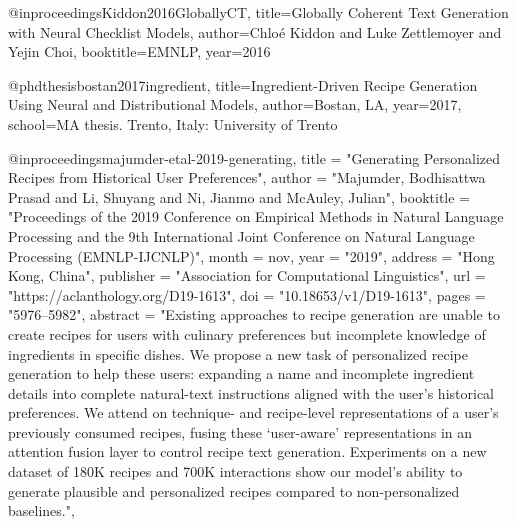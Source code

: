 @inproceedings{Kiddon2016GloballyCT,
  title={Globally Coherent Text Generation with Neural Checklist Models},
  author={Chlo{\'e} Kiddon and Luke Zettlemoyer and Yejin Choi},
  booktitle={EMNLP},
  year={2016}
}

@phdthesis{bostan2017ingredient,
  title={Ingredient-Driven Recipe Generation Using Neural and Distributional Models},
  author={Bostan, LA},
  year={2017},
  school={MA thesis. Trento, Italy: University of Trento}
}


@inproceedings{majumder-etal-2019-generating,
    title = "Generating Personalized Recipes from Historical User Preferences",
    author = "Majumder, Bodhisattwa Prasad  and
      Li, Shuyang  and
      Ni, Jianmo  and
      McAuley, Julian",
    booktitle = "Proceedings of the 2019 Conference on Empirical Methods in Natural Language Processing and the 9th International Joint Conference on Natural Language Processing (EMNLP-IJCNLP)",
    month = nov,
    year = "2019",
    address = "Hong Kong, China",
    publisher = "Association for Computational Linguistics",
    url = "https://aclanthology.org/D19-1613",
    doi = "10.18653/v1/D19-1613",
    pages = "5976--5982",
    abstract = "Existing approaches to recipe generation are unable to create recipes for users with culinary preferences but incomplete knowledge of ingredients in specific dishes. We propose a new task of personalized recipe generation to help these users: expanding a name and incomplete ingredient details into complete natural-text instructions aligned with the user{'}s historical preferences. We attend on technique- and recipe-level representations of a user{'}s previously consumed recipes, fusing these {`}user-aware{'} representations in an attention fusion layer to control recipe text generation. Experiments on a new dataset of 180K recipes and 700K interactions show our model{'}s ability to generate plausible and personalized recipes compared to non-personalized baselines.",
}



